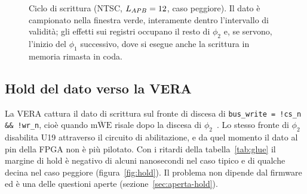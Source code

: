 \documentclass[11pt,a4paper,twoside,openright]{report}
\newcommand{\busok}[4]{%
  \draw[busv] (#2,#1) -- ++(4,0.22) -- (#3-4,#1+0.22) -- (#3,#1) -- (#3-4,#1-0.22) -- (#2+4,#1-0.22) -- cycle;
  \node[font=\tiny] at ({(#2+#3)/2},#1) {#4};}
\newcommand{\busx}[3]{%
  \fill[pattern=north east lines, pattern color=gray!70] (#2,#1-0.22) rectangle (#3,#1+0.22);
  \draw[line width=0.4pt] (#2,#1-0.22) -- (#3,#1-0.22) (#2,#1+0.22) -- (#3,#1+0.22);}
\newcommand{\busz}[3]{\draw[line width=0.8pt, gray] (#2,#1) -- (#3,#1);}
\newcommand{\act}[5]{%
  \fill[#5] (#2,#1-0.16) rectangle (#3,#1+0.16);
  \draw[black!60, line width=0.3pt] (#2,#1-0.16) rectangle (#3,#1+0.16);
  \node[font=\tiny] at ({(#2+#3)/2},#1) {#4};}
\begin{document}
\begin{figure}[htbp]
  \centering
  \caption[Ciclo di scrittura]{Ciclo di scrittura (NTSC, $L_{APB}=12$, caso
  peggiore). Il dato è campionato nella finestra verde, interamente dentro l'intervallo di
  validità; gli effetti sui registri occupano il resto di $\phi_2$ e, se servono, l'inizio
  del $\phi_1$ successivo, dove si esegue anche la scrittura in memoria rimasta in coda.}
  \label{fig:scrittura}
\end{figure}

\subsection{Hold del dato verso la VERA}
\label{sec:hold}

La VERA cattura il dato di scrittura sul fronte di discesa di
\mbox{\texttt{bus\_write = !cs\_n \&\& !wr\_n}}, cioè quando $\overline{\text{mWE}}$ risale
dopo la discesa di $\phi_2$~\cite{hwreq}. Lo stesso fronte di $\phi_2$ disabilita U19
attraverso il circuito di abilitazione, e da quel momento il dato al pin della FPGA non è più
pilotato. Con i ritardi della tabella~\ref{tab:glue} il margine di hold è negativo di alcuni
nanosecondi nel caso tipico e di qualche decina nel caso peggiore (figura~\ref{fig:hold}).
Il problema non dipende dal firmware ed è una delle questioni aperte
(sezione~\ref{sec:aperta-hold}).
\end{document}
